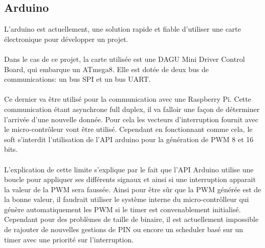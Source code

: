 \subsection{Arduino}



  L'arduino est actuellement, une solution rapide et fiable d'utiliser une carte
électronique pour développer un projet.
\paragraph{}
  Dans le cas de ce projet, la carte utilisée est une DAGU Mini Driver Control
Board, qui embarque un ATmega8. Elle est dotée de deux bus de communications: un
bus SPI et un bus UART.
\paragraph{}
  Ce dernier va être utilisé pour la communication avec une Raspberry Pi. Cette
communication étant asynchrone full duplex, il va falloir une façon de
déterminer l'arrivée d'une nouvelle donnée. Pour cela les
vecteurs d'interruption fournit avec le micro-contrôleur vont être utilisé.
Cependant en fonctionnant comme cela, le soft s'interdit l'utilisation de l'API
arduino pour la génération de PWM 8 et 16 bits.
\paragraph{}
  L'explication de cette limite s'explique par le fait que l'API Arduino utilise
une boucle pour appliquer ses différents signaux et ainsi si une interruption
apparait la valeur de la PWM sera faussée. Ainsi pour être sûr que la PWM
générée est de la bonne valeur, il faudrait utiliser le système interne du
micro-contrôlleur qui génère automatiquement les PWM si le timer est
convenablement initialisé. Cependant pour des problèmes de taille de binaire,
il est actuellement impossible de rajouter de nouvelles gestions de PIN ou
encore un scheduler basé sur un timer avec une priorité sur l'interruption.

